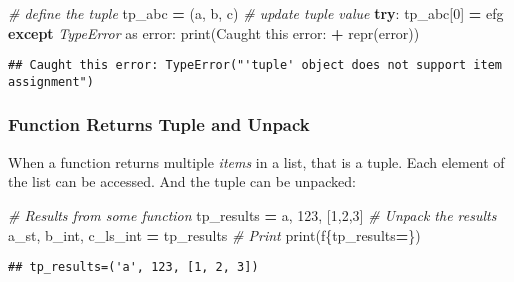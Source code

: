 \documentclass[
]{book}
\newenvironment{Shaded}{\begin{snugshade}}{\end{snugshade}}
\newcommand{\BuiltInTok}[1]{#1}
\newcommand{\CommentTok}[1]{\textcolor[rgb]{0.56,0.35,0.01}{\textit{#1}}}
\newcommand{\ControlFlowTok}[1]{\textcolor[rgb]{0.13,0.29,0.53}{\textbf{#1}}}
\newcommand{\DecValTok}[1]{\textcolor[rgb]{0.00,0.00,0.81}{#1}}
\newcommand{\ImportTok}[1]{#1}
\newcommand{\NormalTok}[1]{#1}
\newcommand{\OperatorTok}[1]{\textcolor[rgb]{0.81,0.36,0.00}{\textbf{#1}}}
\newcommand{\PreprocessorTok}[1]{\textcolor[rgb]{0.56,0.35,0.01}{\textit{#1}}}
\newcommand{\SpecialCharTok}[1]{\textcolor[rgb]{0.00,0.00,0.00}{#1}}
\newcommand{\SpecialStringTok}[1]{\textcolor[rgb]{0.31,0.60,0.02}{#1}}
\newcommand{\StringTok}[1]{\textcolor[rgb]{0.31,0.60,0.02}{#1}}
\begin{document}
\begin{Shaded}
\begin{Highlighting}[]
\CommentTok{\# define the tuple}
\NormalTok{tp\_abc }\OperatorTok{=}\NormalTok{ (}\StringTok{\textquotesingle{}a\textquotesingle{}}\NormalTok{, }\StringTok{\textquotesingle{}b\textquotesingle{}}\NormalTok{, }\StringTok{\textquotesingle{}c\textquotesingle{}}\NormalTok{)}
\CommentTok{\# update tuple value}
\ControlFlowTok{try}\NormalTok{:}
\NormalTok{    tp\_abc[}\DecValTok{0}\NormalTok{] }\OperatorTok{=} \StringTok{\textquotesingle{}efg\textquotesingle{}}
\ControlFlowTok{except} \PreprocessorTok{TypeError} \ImportTok{as}\NormalTok{ error:}
    \BuiltInTok{print}\NormalTok{(}\StringTok{\textquotesingle{}Caught this error: \textquotesingle{}} \OperatorTok{+} \BuiltInTok{repr}\NormalTok{(error))}
\end{Highlighting}
\end{Shaded}

\begin{verbatim}
## Caught this error: TypeError("'tuple' object does not support item assignment")
\end{verbatim}

\hypertarget{function-returns-tuple-and-unpack}{%
\subsubsection{Function Returns Tuple and Unpack}\label{function-returns-tuple-and-unpack}}

When a function returns multiple \emph{items} in a list, that is a tuple. Each element of the list can be accessed. And the tuple can be unpacked:

\begin{Shaded}
\begin{Highlighting}[]
\CommentTok{\# Results from some function}
\NormalTok{tp\_results }\OperatorTok{=} \StringTok{\textquotesingle{}a\textquotesingle{}}\NormalTok{, }\DecValTok{123}\NormalTok{,  [}\DecValTok{1}\NormalTok{,}\DecValTok{2}\NormalTok{,}\DecValTok{3}\NormalTok{]}
\CommentTok{\# Unpack the results}
\NormalTok{a\_st, b\_int, c\_ls\_int }\OperatorTok{=}\NormalTok{ tp\_results}
\CommentTok{\# Print}
\BuiltInTok{print}\NormalTok{(}\SpecialStringTok{f\textquotesingle{}}\SpecialCharTok{\{}\NormalTok{tp\_results}\OperatorTok{=}\SpecialCharTok{\}}\SpecialStringTok{\textquotesingle{}}\NormalTok{)}
\end{Highlighting}
\end{Shaded}

\begin{verbatim}
## tp_results=('a', 123, [1, 2, 3])
\end{verbatim}
\end{document}
